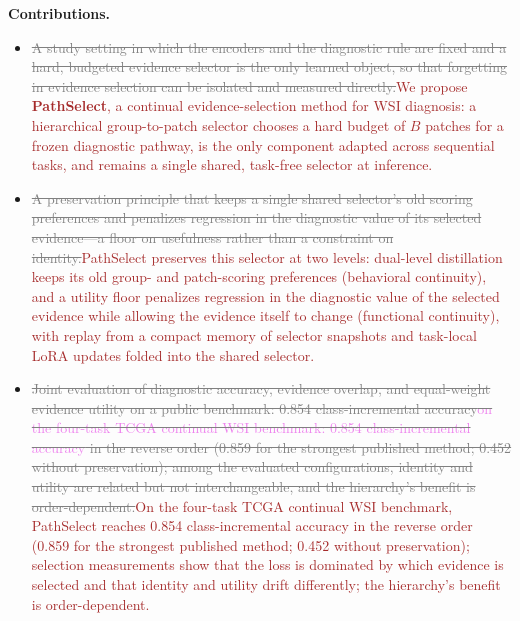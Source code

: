 \documentclass{article}
\newif\ifmarkup \markuptrue
\newcommand{\repc}[3]{\ifmarkup\textcolor{gray}{\sout{#2}}\textcolor{#1}{#3}\else#3\fi}
\newcommand{\repP}[2]{\repc{violet}{#1}{#2}}  %
\newcommand{\repB}[2]{\repc{brown}{#1}{#2}}   %
\begin{document}
\textbf{Contributions.}
\begin{itemize}
    \item \repB{A study setting in which the encoders and the diagnostic rule are fixed and a hard, budgeted evidence selector is the only learned object, so that forgetting in evidence selection can be isolated and measured directly.}{We propose \textbf{PathSelect}, a continual evidence-selection method for WSI diagnosis: a hierarchical group-to-patch selector chooses a hard budget of $B$ patches for a frozen diagnostic pathway, is the only component adapted across sequential tasks, and remains a single shared, task-free selector at inference.}
    \item \repB{A preservation principle that keeps a single shared selector's old scoring preferences and penalizes regression in the diagnostic value of its selected evidence---a floor on usefulness rather than a constraint on identity.}{PathSelect preserves this selector at two levels: dual-level distillation keeps its old group- and patch-scoring preferences (behavioral continuity), and a utility floor penalizes regression in the diagnostic value of the selected evidence while allowing the evidence itself to change (functional continuity), with replay from a compact memory of selector snapshots and task-local LoRA updates folded into the shared selector.}
    \item \repB{Joint evaluation of diagnostic accuracy, evidence overlap, and equal-weight evidence utility \repP{on a public benchmark: 0.854 class-incremental accuracy}{on the four-task TCGA continual WSI benchmark: 0.854 class-incremental accuracy} in the reverse order (0.859 for the strongest published method; 0.452 without preservation); among the evaluated configurations, identity and utility are related but not interchangeable, and the hierarchy's benefit is order-dependent.}{On the four-task TCGA continual WSI benchmark, PathSelect reaches 0.854 class-incremental accuracy in the reverse order (0.859 for the strongest published method; 0.452 without preservation); selection measurements show that the loss is dominated by which evidence is selected and that identity and utility drift differently; the hierarchy's benefit is order-dependent.}
\end{itemize}
\end{document}
